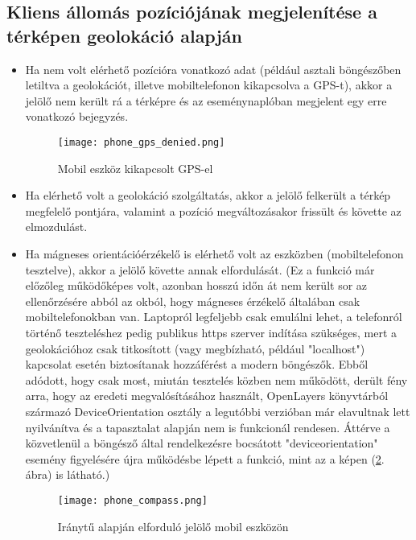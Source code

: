 \subsection{Kliens állomás pozíciójának megjelenítése a térképen geolokáció alapján}

\begin{itemize}

  \item Ha nem volt elérhető pozícióra vonatkozó adat (például asztali
  böngészőben letiltva a geolokációt, illetve mobiltelefonon kikapcsolva a
  GPS-t), akkor a jelölő nem került rá a térképre és az eseménynaplóban
  megjelent egy erre vonatkozó bejegyzés.
  \begin{figure}[H]
    \texttt{[image: phone\_gps\_denied.png]}
    \caption{Mobil eszköz kikapcsolt GPS-el}
    \label{fig:phone_gps_denied}
  \end{figure}

  \item Ha elérhető volt a geolokáció szolgáltatás, akkor a jelölő felkerült a
  térkép megfelelő pontjára, valamint a pozíció megváltozásakor frissült és
  követte az elmozdulást.

  \item Ha mágneses orientációérzékelő is elérhető volt az eszközben
  (mobiltelefonon tesztelve), akkor a jelölő követte annak elfordulását.
  (Ez a funkció már előzőleg működőképes volt, azonban hosszú időn át nem került
  sor az ellenőrzésére abból az okból, hogy mágneses érzékelő általában csak
  mobiltelefonokban van. Laptopról legfeljebb csak emulálni lehet, a telefonról
  történő teszteléshez pedig publikus https szerver indítása szükséges, mert a
  geolokációhoz csak titkosított (vagy megbízható, például "localhost")
  kapcsolat esetén biztosítanak hozzáférést a modern böngészők. Ebből adódott,
  hogy csak most, miután tesztelés közben nem működött, derült fény arra, hogy
  az eredeti megvalósításához használt, OpenLayers könyvtárból származó
  DeviceOrientation osztály a legutóbbi verzióban már elavultnak lett
  nyilvánítva és a tapasztalat alapján nem is funkcionál rendesen. Áttérve a
  közvetlenül a böngésző által rendelkezésre bocsátott "deviceorientation"
  esemény figyelésére újra működésbe lépett a funkció, mint az a képen
  (\ref{fig:phone_compass}. ábra) is látható.)

  \begin{figure}[H]
    \texttt{[image: phone\_compass.png]}
    \caption{Iránytű alapján elforduló jelölő mobil eszközön}
    \label{fig:phone_compass}
  \end{figure}

\end{itemize}


